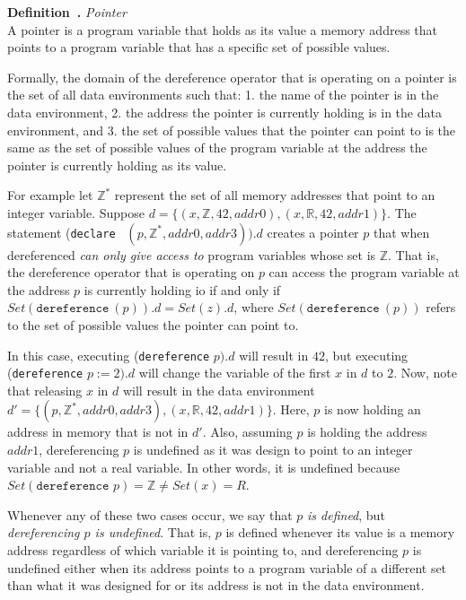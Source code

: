 \documentclass[11pt]{article}
\newcounter{definition}
\newenvironment{definition}[1][]{\stepcounter{definition}\par\medskip\noindent
\textbf{Definition~\thesection.\thedefinition #1} \rmfamily}{}
\newcounter{example}
\newcounter{case}
\newcounter{result}
\begin{document}
\begin{definition} \emph{Pointer} \\
A pointer is a program variable that holds as its value a memory address that points to a program variable that has a specific set of possible values. \medskip
\end{definition}

Formally, the domain of the dereference operator that is operating on a pointer is the set of all data environments such that: 1. the name of the pointer is in the data environment, 2. the address the pointer is currently holding is in the data environment, and 3. the set of possible values that the pointer can point to is the same as the set of possible values of the program variable at the address the pointer is currently holding as its value.

For example let $\mathbb{Z}^*$ represent the set of all memory addresses that point to an integer variable. Suppose $d=\{(x,\mathbb{Z},42,addr0), (x,\mathbb{R},42,addr1)\}$. The statement (\texttt{declare } $(p,\mathbb{Z}^*, addr0, addr3)).d$ creates a pointer $p$ that when dereferenced \emph{can only give access to} program variables whose set is $\mathbb{Z}$. That is, the dereference operator that is operating on $p$ can access the program variable at the address $p$ is currently holding io if and only if $Set(\texttt{dereference}\ (p)).d = Set(z).d$, where $Set(\texttt{dereference}\ (p))$ refers to the set of possible values the pointer can point to.

In this case, executing (\texttt{dereference} $p).d$ will result in $42$, but executing (\texttt{dereference} $p:=2).d$ will change the variable of the first $x$ in $d$ to $2$. Now, note that releasing $x$ in $d$ will result in the data environment $d'=\{(p,\mathbb{Z}^*, addr0, addr3), (x,\mathbb{R},42,addr1)\}$. Here, $p$ is now holding an address in memory that is not in $d'$. Also, assuming $p$ is holding the address $addr1$, dereferencing $p$ is undefined as it was design to point to an integer variable and not a real variable. In other words, it is undefined because $Set(\texttt{dereference }p)=\mathbb{Z}\neq Set(x)=R$.

Whenever any of these two cases occur, we say that $p$\emph{ is defined}, but \emph{dereferencing $p$ is undefined}. That is, $p$ is defined whenever its value is a memory address regardless of which variable it is pointing to, and dereferencing $p$ is undefined either when its address points to a program variable of a different set than what it was designed for or its address is not in the data environment.
\end{document}
